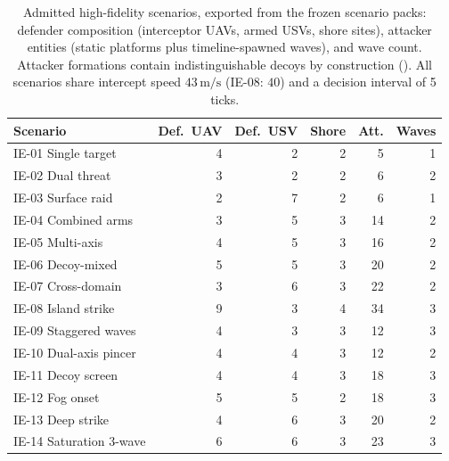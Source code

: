 \begin{table}[t]
\centering
\small
\caption{Admitted high-fidelity scenarios, exported from the frozen scenario packs: defender composition (interceptor UAVs, armed USVs, shore sites), attacker entities (static platforms plus timeline-spawned waves), and wave count. Attacker formations contain indistinguishable decoys by construction (). All scenarios share intercept speed $43\,\mathrm{m/s}$ (IE-08: $40$) and a decision interval of 5 ticks.}
\label{tab:scenparams}
\begin{tabular}{lrrrrr}
\toprule
Scenario & Def.~UAV & Def.~USV & Shore & Att. & Waves \\
\midrule
IE-01 Single target & 4 & 2 & 2 & 5 & 1 \\
IE-02 Dual threat & 3 & 2 & 2 & 6 & 2 \\
IE-03 Surface raid & 2 & 7 & 2 & 6 & 1 \\
IE-04 Combined arms & 3 & 5 & 3 & 14 & 2 \\
IE-05 Multi-axis & 4 & 5 & 3 & 16 & 2 \\
IE-06 Decoy-mixed & 5 & 5 & 3 & 20 & 2 \\
IE-07 Cross-domain & 3 & 6 & 3 & 22 & 2 \\
IE-08 Island strike & 9 & 3 & 4 & 34 & 3 \\
IE-09 Staggered waves & 4 & 3 & 3 & 12 & 3 \\
IE-10 Dual-axis pincer & 4 & 4 & 3 & 12 & 2 \\
IE-11 Decoy screen & 4 & 4 & 3 & 18 & 3 \\
IE-12 Fog onset & 5 & 5 & 2 & 18 & 3 \\
IE-13 Deep strike & 4 & 6 & 3 & 20 & 2 \\
IE-14 Saturation 3-wave & 6 & 6 & 3 & 23 & 3 \\
\bottomrule
\end{tabular}
\end{table}
